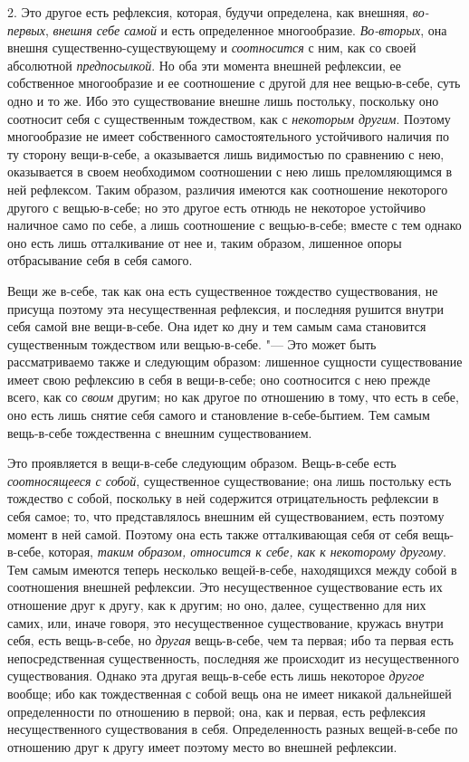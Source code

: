 2. Это другое есть рефлексия, которая, будучи определена, как внешняя,
{\em во-первых}, {\em внешня себе
самой} и есть определенное многообразие.
{\em Во-вторых}, она внешня существенно-существующему и
{\em соотносится} с ним, как со своей абсолютной
{\em предпосылкой}. Но оба эти момента внешней
рефлексии, ее собственное многообразие и ее соотношение с другой для нее
вещью-в-себе, суть одно и то же. Ибо это существование внешне лишь
постольку, поскольку оно соотносит себя с существенным тождеством, как с
{\em некоторым другим}. Поэтому многообразие не имеет
собственного самостоятельного устойчивого наличия по ту сторону
вещи-в-себе, а оказывается лишь видимостью по сравнению с нею, оказывается
в своем необходимом соотношении с нею лишь преломляющимся в ней рефлексом.
Таким образом, различия имеются как соотношение некоторого другого с
вещью-в-себе; но это другое есть отнюдь не некоторое устойчиво наличное
само по себе, а лишь соотношение с вещью-в-себе; вместе с тем однако оно
есть лишь отталкивание от нее и, таким образом, лишенное опоры отбрасывание
себя в себя самого.

Вещи же в-себе, так как она есть существенное тождество существования, не
присуща поэтому эта несущественная рефлексия, и последняя рушится внутри
себя самой вне вещи-в-себе. Она идет ко дну и тем самым сама становится
существенным тождеством или вещью-в-себе. "--- Это может быть рассматриваемо
также и следующим образом: лишенное сущности существование имеет свою
рефлексию в себя в вещи-в-себе; оно соотносится с нею прежде всего, как со
{\em своим} другим; но как другое по отношению в тому,
что есть в себе, оно есть лишь снятие себя самого и становление
в-себе-бытием. Тем самым вещь-в-себе тождественна с внешним существованием.

Это проявляется в вещи-в-себе следующим образом. Вещь-в-себе есть
{\em соотносящееся с собой}, существенное
существование; она лишь постольку есть тождество с собой, поскольку в ней
содержится отрицательность рефлексии в себя самое; то, что представлялось
внешним ей существованием, есть поэтому момент в ней самой. Поэтому она
есть также отталкивающая себя от себя вещь-в-себе, которая,
{\em таким образом, относится к себе, как к некоторому
другому}. Тем самым имеются теперь несколько вещей-в-себе, находящихся
между собой в соотношения внешней рефлексии. Это несущественное
существование есть их отношение друг к другу, как к другим; но оно, далее,
существенно для них самих, или, иначе говоря, это несущественное
существование, кружась внутри себя, есть вещь-в-себе, но
{\em другая} вещь-в-себе, чем та первая; ибо та первая
есть непосредственная существенность, последняя же происходит из
несущественного существования. Однако эта другая вещь-в-себе есть лишь
некоторое {\em другое} вообще; ибо как тождественная с
собой вещь она не имеет никакой дальнейшей определенности по отношению в
первой; она, как и первая, есть рефлексия несущественного существования в
себя. Определенность разных вещей-в-себе по отношению друг к другу имеет
поэтому место во внешней рефлексии.

